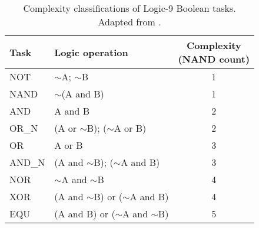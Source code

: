 \begin{table}[h]
\centering
\caption{Complexity classifications of Logic-9 Boolean tasks. Adapted from \citep{lenski2003evolutionary}.}
\label{tab:tasks}
\begin{tabular}{llc}
\hline
Task & Logic operation & \makecell{Complexity\\(NAND count)} \\
\hline
NOT & $\sim$A; $\sim$B & 1 \\
NAND & $\sim$(A and B) & 1 \\
AND & A and B & 2 \\
OR\_N & (A or $\sim$B); ($\sim$A or B) & 2 \\
OR & A or B & 3 \\
AND\_N & (A and $\sim$B); ($\sim$A and B) & 3 \\
NOR & $\sim$A and $\sim$B & 4 \\
XOR & (A and $\sim$B) or ($\sim$A and B) & 4 \\
EQU & (A and B) or ($\sim$A and $\sim$B) & 5 \\
\hline
\end{tabular}
\end{table}
